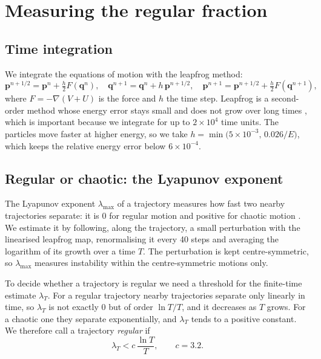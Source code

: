 \documentclass[11pt,a4paper]{article}
\newcommand{\q}{\mathbf{q}}
\newcommand{\p}{\mathbf{p}}
\begin{document}
\section{Measuring the regular fraction}\label{sec:methods}

\subsection{Time integration}
We integrate the equations of motion with the leapfrog method:
\begin{equation}\label{eq:leapfrog}
  \p^{n+1/2}=\p^n+\tfrac h2 F(\q^n),\quad
  \q^{n+1}=\q^n+h\,\p^{n+1/2},\quad
  \p^{n+1}=\p^{n+1/2}+\tfrac h2 F(\q^{n+1}),
\end{equation}
where $F=-\nabla(V+U)$ is the force and $h$ the time step. Leapfrog is a
second-order method whose energy error stays small and does not grow over long
times \cite{hairer2006}, which is important because we integrate for up to
$2\times10^4$ time units. The particles move faster at higher energy, so we
take $h=\min\bigl(5\times10^{-3},\,0.026/E\bigr)$, which keeps the relative
energy error below $6\times10^{-4}$.

\subsection{Regular or chaotic: the Lyapunov exponent}\label{sec:lyap-method}
The Lyapunov exponent $\lambda_{\max}$ of a trajectory measures how fast two
nearby trajectories separate: it is $0$ for regular motion and positive for
chaotic motion \cite{lichtenberg1992}. We estimate it by following, along the trajectory, a small
perturbation with the linearised leapfrog map, renormalising it every 40 steps
and averaging the logarithm of its growth over a time $T$. The perturbation is
kept centre-symmetric, so $\lambda_{\max}$ measures instability within the
centre-symmetric motions only.

To decide whether a trajectory is regular we need a threshold for the
finite-time estimate $\lambda_T$. For a regular trajectory nearby trajectories
separate only linearly in time, so $\lambda_T$ is not exactly $0$ but of order
$\ln T/T$, and it decreases as $T$ grows. For a chaotic one they separate
exponentially, and $\lambda_T$ tends to a positive constant. We therefore call
a trajectory \emph{regular} if
\begin{equation}\label{eq:threshold}
  \lambda_T < c\,\frac{\ln T}{T},\qquad c=3.2 .
\end{equation}
\end{document}
